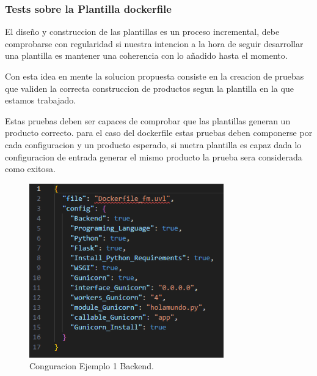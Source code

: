 \documentclass[12pt, a4paper, twoside]{article}
\begin{document}
\newpage

\subsubsection{Tests sobre la Plantilla dockerfile}
El diseño y construccion de las plantillas es un proceso incremental, debe comprobarse con regularidad si nuestra intencion a la hora de seguir desarrollar una plantilla es mantener una coherencia con lo añadido hasta el momento. 

Con esta idea en mente la solucion propuesta consiste en la creacion de pruebas que validen la correcta construccion de productos segun la plantilla en la que estamos trabajado.

Estas pruebas deben ser capaces de comprobar que las plantillas generan un producto correcto. para el caso del dockerfile estas pruebas deben componerse por cada configuracion 
y un producto esperado, si nuetra plantilla es capaz dada lo configuracion de entrada generar el mismo producto la prueba sera considerada como exitosa. 

\begin{figure}[h]
	\centering
	  \includegraphics[width=0.75\textwidth]{dockerfile.configuracion-backend.png}
	\caption{Conguracion Ejemplo 1 Backend.}
\end{figure}

\newpage 
\end{document}
